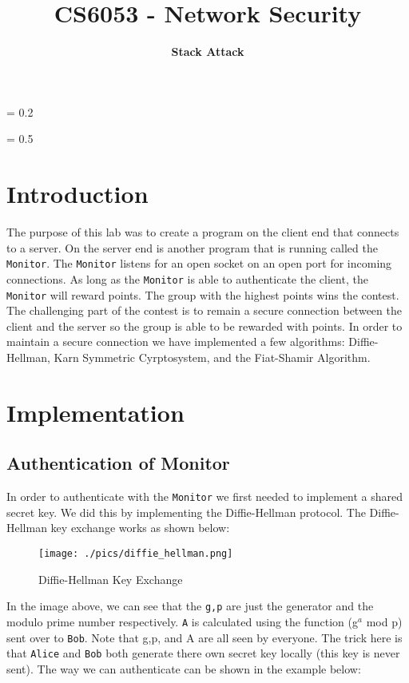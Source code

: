 \documentclass[10pt]{article}
\title{
    \vspace{2in}
    \textmd{\textbf{CS6053 - Network Security}}\\
    \vspace{4in}
}
\author{\textbf{Stack Attack}}
\begin{document}
\maketitle
\newpage
\parskip = 0.2\baselineskip
\newpage
\tableofcontents
\listoffigures
\listoftables
\parskip = 0.5\baselineskip
\newpage

\section{Introduction}
The purpose of this lab was to create a program on the client end that connects
to a server. On the server end is another program that is running called the
\texttt{Monitor}. The \texttt{Monitor} listens for an open socket on an open
port for incoming connections. As long as the \texttt{Monitor} is able to
authenticate the client, the \texttt{Monitor} will reward points. The group with the
highest points wins the contest. The challenging part of the contest is to
remain a secure connection between the client and the server so the group is
able to be rewarded with points. In order to maintain a secure connection we
have implemented a few algorithms: Diffie-Hellman, Karn Symmetric Cyrptosystem,
and the Fiat-Shamir Algorithm.

\section{Implementation}

\subsection{Authentication of Monitor}
In order to authenticate with the \texttt{Monitor} we first needed to implement
a shared secret key. We did this by implementing the Diffie-Hellman protocol. The
Diffie-Hellman key exchange works as shown below:
\begin{figure}[H]
    \centering
    \texttt{[image: ./pics/diffie\_hellman.png]}
    \caption{Diffie-Hellman Key Exchange}
\end{figure}
In the image above, we can see that the \texttt{g,p} are just the generator and
the modulo prime number respectively. \texttt{A} is calculated using the
function (g$^{a}$ mod p) sent over to \texttt{Bob}. Note that g,p, and A are all
seen by everyone. The trick here is that \texttt{Alice} and \texttt{Bob} both
generate there own secret key locally (this key is never sent). The way we can
authenticate can be shown in the example below:
\end{document}
